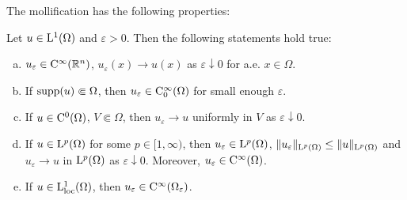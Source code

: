The mollification has the following properties:
\begin{thm}
  \label{thm:mollifier}
  Let $u \in \mathrm{L}^1(\Omega)$ and $\varepsilon > 0$. Then the following statements hold true:
  \begin{enumerate}[a)]
    \item $u_\varepsilon \in \mathrm{C}^\infty(\mathbb{R}^n)$, $u_\varepsilon(x) \to u(x)$ as $\varepsilon \downarrow 0$ for a.e. $x \in \Omega$.
    \item If $\operatorname{supp}(u) \Subset \Omega$, then $u_\varepsilon \in \mathrm{C}_0^\infty(\Omega)$ for small enough $\varepsilon$. 
    \item If $u \in \mathrm{C}^0(\Omega)$, $V \Subset \Omega$, then $u_\varepsilon \to u$ uniformly in $V$ as $\varepsilon \downarrow 0$.
    \item If $u \in \mathrm{L}^p(\Omega)$ for some $p \in [1,\infty)$, then $u_\varepsilon \in \mathrm{L}^p(\Omega)$, $\|u_\varepsilon\|_{\mathrm{L}^p(\Omega)} \leq \|u\|_{\mathrm{L}^p(\Omega)}$ and $u_\varepsilon \to u$ in $\mathrm{L}^p(\Omega)$ as $\varepsilon \downarrow 0$.
      Moreover, $u_\varepsilon \in \mathrm{C}^\infty(\Omega)$.
      \item If $u \in \mathrm{L}_{\operatorname{loc}}^1(\Omega)$, then $u_\varepsilon \in \mathrm{C}^\infty(\Omega_\varepsilon)$.
  \end{enumerate}
  \label{thm:mollification}
\end{thm}


